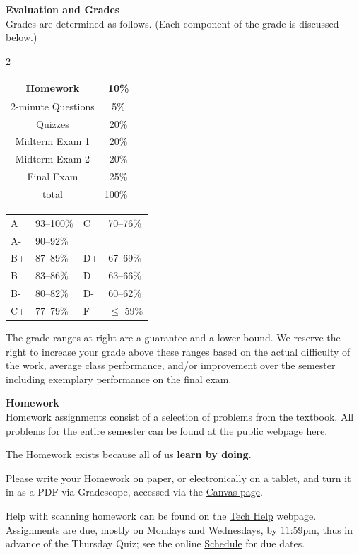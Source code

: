\documentclass[12pt]{article}
\renewcommand{\emph}[1]{\textsf{\textbf{#1}}}
\newcommand{\localhead}[1]{\par\smallskip\textbf{#1} \smallskip\nobreak\\}%
\def\heading#1{\localhead{\large\emph{#1}}}
\begin{document}
\heading{Evaluation and Grades}
Grades are determined as follows.  (Each component of the grade is discussed below.)
 
\begin{multicols}{2}
\begin{tabular}{|c|c|}
\hline
Homework & 10\% \\
\hline
2-minute Questions & 5\% \\
\hline
Quizzes & 20\% \\
\hline
Midterm Exam 1 & 20\% \\
\hline
Midterm Exam 2 & 20\%  \\
\hline
Final Exam & 25\% \\
\hline
total & 100\% \, \\
\hline
\end{tabular}


\begin{tabular}{llll}
A  & 93--100\%& C  & 70--76\%  \\
A- & 90--92\% & &  \\
B+ & 87--89\% & D+ & 67--69\%  \\
B  & 83--86\% & D  & 63--66\%  \\
B- & 80--82\% & D- & 60--62\%  \\
C+ & 77--79\% & F  & $\le$ 59\%
\end{tabular}
\end{multicols}

The grade ranges at right are a guarantee and a lower bound. We reserve the right to increase your grade above these ranges based on the actual difficulty of the work, average class performance, and/or improvement over the semester including exemplary performance on the final exam. \\

\heading{Homework}
Homework assignments consist of a selection of problems from the textbook.  All problems for the entire semester can be found at the public webpage \href{https://uaf-math.github.io/calc2/homework.html}{here}. 

The Homework exists because all of us \textbf{learn by doing}.

Please write your Homework on paper, or electronically on a tablet, and turn it in as a PDF via Gradescope, accessed via the \href{https://canvas.alaska.edu/courses/30035}{Canvas page}.  

Help with scanning homework can be found on the \href{https://uaf-math.github.io/calc2/techHelp.html}{Tech Help} webpage.  Assignments are due, mostly on Mondays and Wednesdays, by 11:59pm, thus in advance of the Thursday Quiz; see the online \href{https://uaf-math.github.io/calc2/assets/general/S26/bueler/schedule.pdf}{Schedule} for due dates.  
\end{document}
